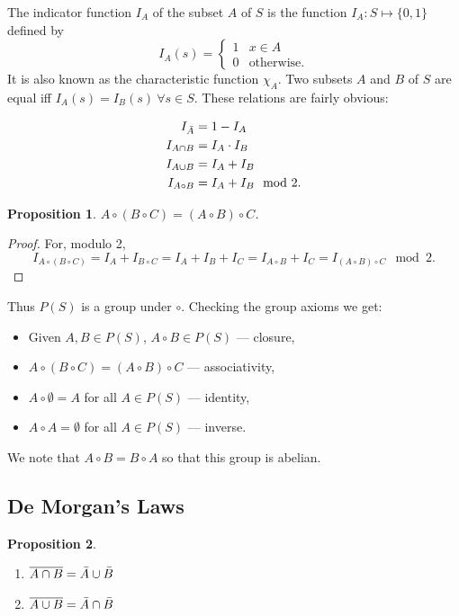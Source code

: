 \documentclass{notes}
\theoremstyle{plain}
\newtheorem*{proposition}{Proposition}
\begin{document}
The indicator function $I_A$ of the subset $A$ of $S$ is the function
$I_A \colon S \mapsto \{0,1\}$ defined by
\[
I_A(s) = \begin{cases}
1 & x \in A \\
0 & \text{otherwise.}
\end{cases}
\]
It is also known as the characteristic function $\chi_A$.  Two subsets
$A$ and $B$ of $S$ are equal iff $I_A(s) = I_B(s)\ \forall s \in S$.  These
relations are fairly obvious:

\begin{align*}
I_{\Bar{A}} &= 1 - I_A \\
I_{A \cap B} &= I_A \cdot I_B \\
I_{A \cup B} &= I_A + I_B \\
I_{A \circ B} &= I_A + I_B \mod{2}.
\end{align*}

\begin{proposition}
$A \circ (B \circ C) = (A \circ B) \circ C$.
\end{proposition}

\begin{proof}
For, modulo 2, 
\[
I_{A \circ (B \circ C)} = I_A + I_{B \circ C}
= I_A + I_B + I_C = I_{A \circ B} + I_C = I_{(A \circ B) \circ C} \mod{2}.
\]
\end{proof}

Thus $P(S)$ is a group under $\circ$.  Checking the group axioms we get:

\begin{itemize}
\item Given $A, B \in P(S)$, $A \circ B \in P(S)$ ---  closure,
\item $A \circ (B \circ C) = (A \circ B) \circ C$ --- associativity,
\item $A \circ \emptyset = A$ for all $A \in P(S)$ --- identity,
\item $A \circ A = \emptyset$ for all $A \in P(S)$ --- inverse.
\end{itemize}

We note that $A \circ B = B \circ A$ so that this group is abelian.

\subsection{De Morgan's Laws}

\begin{proposition}
\begin{enumerate}
\item $\overline{A \cap B} = \Bar{A} \cup \Bar{B}$
\item $\overline{A \cup B} = \Bar{A} \cap \Bar{B}$
\end{enumerate}
\end{proposition}
\end{document}
